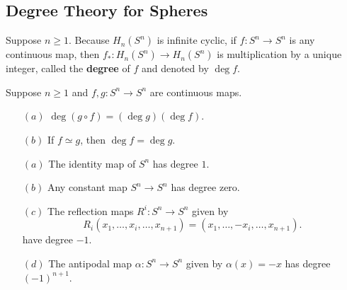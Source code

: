 \subsection{Degree Theory for Spheres}
Suppose $n\geq1$. Because $H_n(S^n)$ is infinite cyclic, if $f:S^n\to S^n$ is any continuous map, then $f_*:H_n(S^n)\to H_n(S^n)$ is multiplication by a unique integer, called the \textbf{degree} of $f$ and denoted by $\deg f$.
\begin{proposition}
Suppose $n\geq1$ and $f,g:S^n\to S^n$ are continuous maps.
\begin{itemize}
\item[$(a)$]$\deg(g\circ f)=(\deg g)(\deg f)$.
\item[$(b)$]If $f\simeq g$, then $\deg f=\deg g$.
\end{itemize}
\end{proposition}
\begin{proposition}
\mbox{}
\begin{itemize}
\item[$(a)$]The identity map of $S^n$ has degree $1$.
\item[$(b)$]Any constant map $S^n\to S^n$ has degree zero.
\item[$(c)$]The reflection maps $R^i:S^n\to S^n$ given by
\[R_i(x_1,\dots,x_i,\dots,x_{n+1})=(x_1,\dots,-x_i,\dots,x_{n+1}).\]
have degree $-1$.
\item[$(d)$]The antipodal map $\alpha:S^n\to S^n$ given by $\alpha(x)=-x$ has degree $(-1)^{n+1}$.
\end{itemize}
\end{proposition}
